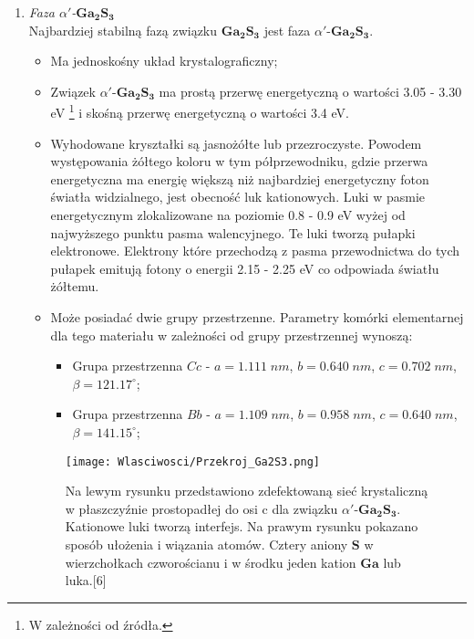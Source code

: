 \begin{enumerate}
	\item \textit{Faza $\alpha'$-$\mathbf{Ga_{2}S_{3}}$} \\
	Najbardziej stabilną fazą związku $\mathbf{Ga_{2}S_{3}}$ jest faza $\alpha'$-$\mathbf{Ga_{2}S_{3}}$.
	\begin{itemize}
		\item Ma jednoskośny układ krystalograficzny;
		\item Związek $\alpha'$-$\mathbf{Ga_{2}S_{3}}$ ma prostą przerwę energetyczną o wartości 3.05 - 3.30 eV \footnote{W zależności od źródła.} i skośną przerwę energetyczną o wartości 3.4 eV.
		\item Wyhodowane kryształki są jasnożółte lub przezroczyste. Powodem występowania żółtego koloru w tym półprzewodniku, gdzie przerwa energetyczna ma energię większą niż najbardziej energetyczny foton światła widzialnego, jest obecność luk kationowych. Luki w pasmie energetycznym zlokalizowane na poziomie 0.8 - 0.9 eV wyżej od najwyższego punktu pasma walencyjnego. Te luki tworzą pułapki elektronowe. Elektrony które przechodzą z pasma przewodnictwa do tych pułapek emitują fotony o energii 2.15 - 2.25 eV co odpowiada światłu żółtemu.
		\item Może posiadać dwie grupy przestrzenne. Parametry komórki elementarnej dla tego materiału w zależności od grupy przestrzennej wynoszą:
		\begin{itemize}
			\item Grupa przestrzenna $Cc$ - $a=1.111\;nm$, $b=0.640\;nm$, $c=0.702\;nm$, $\beta=121.17^{\circ}$;
			\item Grupa przestrzenna $Bb$ -  $a=1.109\;nm$, $b=0.958\;nm$, $c=0.640\;nm$, $\beta=141.15^{\circ}$;
		\end{itemize}
	\end{itemize} 
	
	\begin{figure}[H]
		\begin{center}
			\texttt{[image: Wlasciwosci/Przekroj\_Ga2S3.png]}
			\caption{Na lewym rysunku przedstawiono zdefektowaną sieć krystaliczną w płaszczyźnie prostopadłej do osi c dla związku $\alpha'$-$\mathbf{Ga_{2}S_{3}}$. Kationowe luki tworzą interfejs. Na prawym rysunku pokazano sposób ułożenia i wiązania atomów. Cztery aniony $\mathbf{S}$ w wierzchołkach czworościanu i w środku jeden kation $\mathbf{Ga}$ lub luka.[6]}
		\end{center}
	\end{figure}
	

\end{enumerate}
